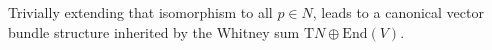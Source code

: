 Trivially extending that isomorphism to all $p \in N$, leads to a canonical vector bundle structure inherited by the Whitney sum $\mathrm{T}N \oplus \mathrm{End}(V)$.
%
%
%
%
%
